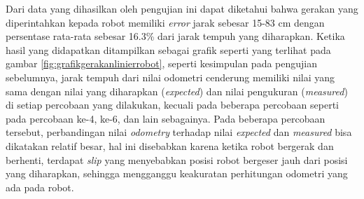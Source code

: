 

Dari data yang dihasilkan oleh pengujian ini dapat diketahui bahwa gerakan yang diperintahkan kepada robot memiliki \emph{error} jarak sebesar 15-83 cm dengan persentase rata-rata sebesar 16.3\% dari jarak tempuh yang diharapkan.
Ketika hasil yang didapatkan ditampilkan sebagai grafik seperti yang terlihat pada gambar \ref{fig:grafikgerakanlinierrobot},
  seperti kesimpulan pada pengujian sebelumnya,
  jarak tempuh dari nilai odometri cenderung memiliki nilai yang sama dengan nilai yang diharapkan (\emph{expected}) dan nilai pengukuran (\emph{measured}) di setiap percobaan yang dilakukan,
  kecuali pada beberapa percobaan seperti pada percobaan ke-4, ke-6, dan lain sebagainya.
Pada beberapa percobaan tersebut, perbandingan nilai \emph{odometry} terhadap nilai \emph{expected} dan \emph{measured} bisa dikatakan relatif besar,
  hal ini disebabkan karena ketika robot bergerak dan berhenti, terdapat \emph{slip} yang menyebabkan posisi robot bergeser jauh dari posisi yang diharapkan,
  sehingga mengganggu keakuratan perhitungan odometri yang ada pada robot.


